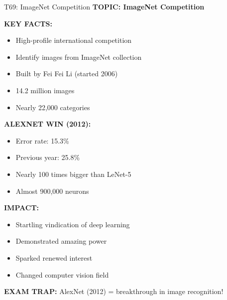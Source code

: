 \documentclass[8pt]{beamer}
\begin{document}
	\begin{frame}{T69: ImageNet Competition}
		\fontsize{6.5}{7.5}\selectfont
		\textbf{TOPIC: ImageNet Competition}
		
		\vspace{0.1cm}
		\textbf{KEY FACTS:}
		\begin{itemize}
			\item High-profile international competition
			\item Identify images from ImageNet collection
			\item Built by Fei Fei Li (started 2006)
			\item 14.2 million images
			\item Nearly 22,000 categories
		\end{itemize}
		
		\vspace{0.1cm}
		\textbf{ALEXNET WIN (2012):}
		\begin{itemize}
			\item Error rate: 15.3\%
			\item Previous year: 25.8\%
			\item Nearly 100 times bigger than LeNet-5
			\item Almost 900,000 neurons
		\end{itemize}
		
		\vspace{0.1cm}
		\textbf{IMPACT:}
		\begin{itemize}
			\item Startling vindication of deep learning
			\item Demonstrated amazing power
			\item Sparked renewed interest
			\item Changed computer vision field
		\end{itemize}
		
		\textcolor{myred}{\textbf{EXAM TRAP:}} AlexNet (2012) = \textcolor{myblue}{breakthrough in image recognition}!
	\end{frame}
	
\end{document}
